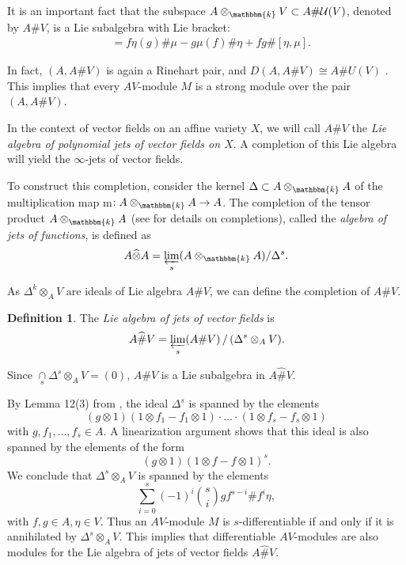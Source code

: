 \documentclass[12pt]{amsart}
\renewcommand{\k}{{\mathbbm{k}}}
\newcommand{\U}{{\mathcal{U}}}
\renewcommand{\sp}{{\#}}
\theoremstyle{definition}
\newtheorem{definition}{Definition}[section]
\begin{document}
It is an important fact that the subspace $A \otimes_{\k} V \subset A \sp \U(V)$, denoted by $A \sp V$, is a Lie subalgebra with Lie bracket:
\begin{align*}
[f \sp \eta, g \sp \mu] &=  f \eta(g) \sp \mu - g \mu(f) \sp \eta  + fg \sp [\eta, \mu].
\end{align*}

In fact, $(A, A \sp V)$ is again a Rinehart pair, and $D(A, A\sp V) \cong A \sp U(V)$ \cite[Lemmas 6-7]{BilligIngalls}.
This implies that every $AV$-module $M$ is a strong module over the pair
$(A, A \sp V)$.

In the context of vector fields on an affine variety $X$, we will call $A \sp V$ the \emph{Lie algebra of polynomial jets of vector fields on $X$}.
A completion of this Lie algebra will yield the $\infty$-jets of vector fields.

To construct this completion, 
consider the kernel $\Delta \subset A \otimes_\k A$ of the multiplication map m$: A \otimes_\k A \rightarrow A$. The completion of the tensor product $A \otimes_\k A$ (see \cite{AtiyahM} for details on completions), called the \emph{algebra of jets of functions}, is defined as
\[
A \widehat{\otimes} A  = \varprojlim\limits_s (A \otimes_\k A) /\Delta^s.
\]

As $\Delta^k \otimes_A V$ are ideals of Lie algebra $A \sp V$, we can define the completion of $A \sp V$. 

\begin{definition}\label{definition:algebrajets}
The \emph{Lie algebra of jets of vector fields} is 
\[
A \widehat{\sp} V = \varprojlim\limits_s (A \sp V)\,/\,(\Delta^s \otimes_A V).
\] 
\end{definition}

Since $\mathop\cap\limits_s \Delta^s \otimes_A V = (0)$, $A \sp V$ is a Lie subalgebra in $A \widehat{\sp} V$.

By Lemma 12(3) from \cite{BilligIngalls}, the ideal $\Delta^s$ is spanned by the elements
\[
(g \otimes 1) (1 \otimes f_1 - f_1 \otimes 1) \cdot \ldots \cdot (1 \otimes f_s - f_s \otimes 1)
\]
with $g, f_1, \ldots, f_s \in A$. A linearization argument shows that this ideal is also spanned by the elements of the form
\[
(g \otimes 1) (1 \otimes f - f \otimes 1)^s.
\]
We conclude that $\Delta^s \otimes_A V$ is spanned by the elements 
\[
\sum_{i=0}^s (-1)^i \binom{s}{i} g f^{s-i} \# f^i \eta,
\]
with $f, g \in A, \eta \in V$.
Thus an $AV$-module $M$ is $s$-differentiable if and only if it is annihilated by $\Delta^s \otimes_A V$. This implies that differentiable $AV$-modules are also modules for the Lie algebra of jets of vector fields $A \widehat{\sp} V$.
\end{document}
